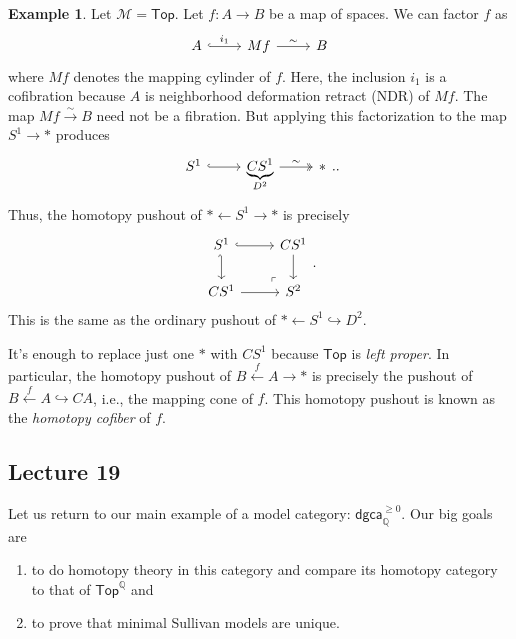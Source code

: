 \documentclass[10pt,letterpaper,cm]{nupset}
\theoremstyle{definition}
\newtheorem{exmp}[defn]{Example}
\theoremstyle{theorem}
\theoremstyle{remark}
\newcommand{\Q}{\mathbb Q}
\newcommand{\1}{\mathbb{1}}
\newcommand{\m}{\mathcal{M}}
\newcommand{\dgca}{\mathsf{dgca}}
\newcommand{\0}{\vec 0}
\newcommand{\be}{\begin{enumerate}}
\newcommand{\ee}{\end{enumerate}}
\begin{document}
\begin{exmp}
Let $\m = \mathsf{Top}$. Let $f: A \to B$ be a map of spaces. We can factor $f$ as
\[
\begin{tikzcd}
	A & {M{f}} & B
	\arrow["\sim", from=1-2, to=1-3]
	\arrow["i_1",hook, from=1-1, to=1-2]
\end{tikzcd}
\]
where $M{f}$ denotes the mapping cylinder of $f$. Here, the inclusion $i_1$ is a cofibration because $A$ is neighborhood deformation retract (NDR) of $M{f}$. The map $M{f} \xrightarrow{\sim} B$ need not be a fibration. But applying this factorization to the map $S^1 \to \ast$ produces 
\[
\begin{tikzcd}
	{S^1} & {\underbrace{C{S^1}}_{D^2}} & \ast
	\arrow["\sim", two heads, from=1-2, to=1-3]
	\arrow[hook, from=1-1, to=1-2]
\end{tikzcd}.
.\] Thus, the homotopy pushout  of $\ast \leftarrow S^1 \rightarrow \ast$ is precisely
\[
\begin{tikzcd}
	{S^1} & {C{S^1}} \\
	{C{S^1}} & {S^2}
	\arrow[hook', from=1-1, to=2-1]
	\arrow[hook, from=1-1, to=1-2]
	\arrow[from=1-2, to=2-2]
	\arrow[from=2-1, to=2-2]
	\arrow["\lrcorner"{anchor=center, pos=0.125, rotate=180}, draw=none, from=2-2, to=1-1]
\end{tikzcd}
.\] This is the same as the ordinary pushout of $\ast \leftarrow S^1 \hookrightarrow D^2$.

\medskip

It's enough to replace just one $\ast$ with $C{S^1}$ because $\mathsf{Top}$ is \textit{left proper}. In particular, the homotopy pushout of $B \overset{f}{\longleftarrow} A \to  \ast$ is precisely the pushout of $B \overset{f}{\longleftarrow} A \hookrightarrow  C{A}$, i.e., the mapping cone of $f$. This homotopy pushout is known as the \textit{homotopy cofiber} of $f$.
\end{exmp}


\subsection{Lecture 19}

Let us return to our main example of a model category: $\dgca_{\Q}^{\geq 0}$. Our big goals are
\be
\item  to do homotopy theory in this category and compare its homotopy category to that of $\mathsf{Top}^{\Q}$ and
\item to prove that minimal Sullivan models are unique.
\ee
\end{document}
